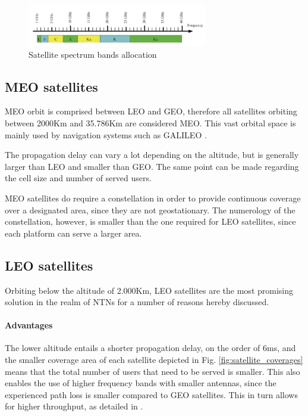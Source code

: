 \begin{figure}[ht]
    \centering
    \includegraphics[width=0.7\textwidth]{res/satellite-bands.png}
    \caption{Satellite spectrum bands allocation \cite{advances-comm-sat-sys}}
    \label{fig:satellite-bands}
\end{figure}

\subsection{MEO satellites}
\ac{MEO} orbit is comprised between \ac{LEO} and \ac{GEO}, therefore all satellites orbiting between 2000Km and 35.786Km are considered \ac{MEO}. This vast orbital space is mainly used by navigation systems such as GALILEO \cite{types-of-orbits-esa}.

The propagation delay can vary a lot depending on the altitude, but is generally larger than \ac{LEO} and smaller than \ac{GEO}. The same point can be made regarding the cell size and number of served users. 

\ac{MEO} satellites do require a constellation in order to provide continuous coverage over a designated area, since they are not geostationary. The numerology of the constellation, however, is smaller than the one required for \ac{LEO} satellites, since each platform can serve a larger area.

\subsection{LEO satellites}
Orbiting below the altitude of 2.000Km, \ac{LEO} satellites are the most promising solution in the realm of \ac{NTNs} for a number of reasons hereby discussed.

\paragraph{Advantages}
The lower altitude entails a shorter propagation delay, on the order of 6ms, and the smaller coverage area of each satellite depicted in Fig. \ref{fig:satellite_coverages} means that the total number of users that need to be served is smaller. This also enables the use of higher frequency bands with smaller antennas, since the experienced path loss is smaller compared to \ac{GEO} satellites. This in turn allows for higher throughput, as detailed in \cite{satellite-communication-mmwave-giordani}.

